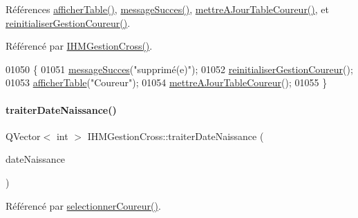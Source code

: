 Références \hyperlink{class_i_h_m_gestion_cross_ae1510779a1efa3defecb517467e84f91}{afficher\+Table()}, \hyperlink{class_i_h_m_gestion_cross_a71412d0c3e1d059a646c755803077a7b}{message\+Succes()}, \hyperlink{class_i_h_m_gestion_cross_a53c84315d723d75ad7b4a7d4c317efc5}{mettre\+A\+Jour\+Table\+Coureur()}, et \hyperlink{class_i_h_m_gestion_cross_a85c44933ec0dcbb591e01c832063367e}{reinitialiser\+Gestion\+Coureur()}.



Référencé par \hyperlink{class_i_h_m_gestion_cross_a2c62fd83326a87456a403f46acc408c8}{I\+H\+M\+Gestion\+Cross()}.


\begin{DoxyCode}
01050 \{
01051     \hyperlink{class_i_h_m_gestion_cross_a71412d0c3e1d059a646c755803077a7b}{messageSucces}(\textcolor{stringliteral}{"supprimé(e)"});
01052     \hyperlink{class_i_h_m_gestion_cross_a85c44933ec0dcbb591e01c832063367e}{reinitialiserGestionCoureur}();
01053     \hyperlink{class_i_h_m_gestion_cross_ae1510779a1efa3defecb517467e84f91}{afficherTable}(\textcolor{stringliteral}{"Coureur"});
01054     \hyperlink{class_i_h_m_gestion_cross_a53c84315d723d75ad7b4a7d4c317efc5}{mettreAJourTableCoureur}();
01055 \}
\end{DoxyCode}
\mbox{\label{class_i_h_m_gestion_cross_a4846dcb0c5f95b2b774ab328654bf716}} 
\paragraph{\texorpdfstring{traiter\+Date\+Naissance()}{traiterDateNaissance()}}
{\footnotesize\ttfamily Q\+Vector$<$ int $>$ I\+H\+M\+Gestion\+Cross\+::traiter\+Date\+Naissance (\begin{DoxyParamCaption}\item[{Q\+String}]{date\+Naissance }\end{DoxyParamCaption})\hspace{0.3cm}{\ttfamily [private]}}



Référencé par \hyperlink{class_i_h_m_gestion_cross_ad71963d500fd61995fdae94e833db163}{selectionner\+Coureur()}.


